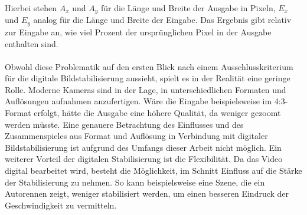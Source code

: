     Hierbei stehen $A_x$ und $A_y$ für die Länge und Breite der Ausgabe in Pixeln, $E_x$ und $E_y$
    analog für die Länge und Breite der Eingabe. Das Ergebnis gibt relativ zur Eingabe an, wie viel
    Prozent der ursprünglichen Pixel in der Ausgabe enthalten sind. \\
    \\
    Obwohl diese Problematik auf den ersten Blick nach einem Ausschlusskriterium für die digitale
    Bildstabilisierung aussieht, spielt es in der Realität eine geringe Rolle. Moderne Kameras sind
    in der Lage, in unterschiedlichen Formaten und Auflösungen aufnahmen anzufertigen. Wäre die Eingabe
    beispielsweise im 4:3-Format erfolgt, hätte die Ausgabe eine höhere Qualität, da weniger gezoomt
    werden müsste. Eine genauere Betrachtung des Einflusses und des Zusammenspieles aus Format und
    Auflösung in Verbindung mit digitaler Bildstabilisierung ist aufgrund des Umfangs dieser Arbeit
    nicht möglich. Ein weiterer Vorteil der digitalen Stabilisierung ist die Flexibilität. Da das Video
    digital bearbeitet wird, besteht die Möglichkeit, im Schnitt Einfluss auf die Stärke der Stabilisierung
    zu nehmen. So kann beispielsweise eine Szene, die ein Autorennen zeigt, weniger stabilisiert werden,
    um einen besseren Eindruck der Geschwindigkeit zu vermitteln.